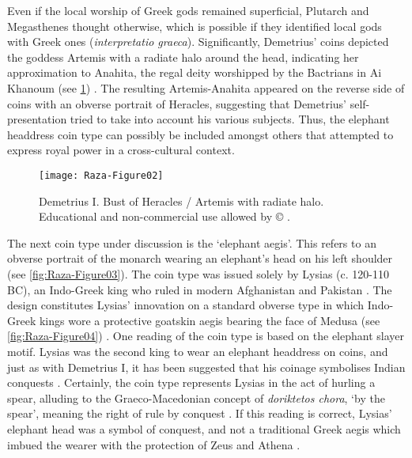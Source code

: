\documentclass{ijsra}
\renewcommand\BC{{\,BC\xspace}}
\def\coinindia{Educational and non-commercial use allowed by © \cite{Coin}.}
\begin{document}
Even if the local worship of Greek gods remained superficial, Plutarch and Megasthenes thought otherwise, which is possible if they identified local gods with Greek ones (\emph{interpretatio graeca}).
Significantly, Demetrius’ coins depicted the goddess Artemis with a radiate halo around the head, indicating her approximation to Anahita, the regal deity worshipped by the Bactrians in Ai Khanoum (see \cref{fig:Raza-Figure02})  \parencites[242]{MacDowall2007b}[420]{Potter2003}.
The resulting Artemis-Anahita appeared on the reverse side of coins with an obverse portrait of Heracles, suggesting that Demetrius’ self-presentation tried to take into account his various subjects.
Thus, the elephant headdress coin type can possibly be included amongst others that attempted to express royal power in a cross-cultural context.

\begin{figure}[!htb] %
	\centering
	\texttt{[image: Raza-Figure02]}
	\caption{Demetrius I. Bust of Heracles / Artemis with radiate halo. 
		{\normalfont\scriptsize \\ \coinindia}}
	\label{fig:Raza-Figure02}
\end{figure}

The next coin type under discussion is the ‘elephant aegis’.
This refers to an obverse portrait of the monarch wearing an elephant’s head on his left shoulder (see \cref{fig:Raza-Figure03}).
The coin type was issued solely by Lysias (c. 120-110\BC), an Indo-Greek king who ruled in modern Afghanistan and Pakistan \parencite[121]{Mairs2014}.
The design constitutes Lysias’ innovation on a standard obverse type in which Indo-Greek kings wore a protective goatskin aegis bearing the face of Medusa (see \cref{fig:Raza-Figure04}) \parencite[35]{Whitehead1970}.
One reading of the coin type is based on the elephant slayer motif. Lysias was the second king to wear an elephant headdress on coins, and just as with Demetrius I, it has been suggested that his coinage symbolises Indian conquests \parencites[341]{Cribb2011}[107]{Widemann2003}.
Certainly, the coin type represents Lysias in the act of hurling a spear, alluding to the Graeco-Macedonian concept of \emph{doriktetos chora}, ‘by the spear’, meaning the right of rule by conquest \parencite[27]{Billows1995}.
If this reading is correct, Lysias’ elephant head was a symbol of conquest, and not a traditional Greek aegis which imbued the wearer with the protection of Zeus and Athena \parencite[185]{Holt1999}.
\end{document}
